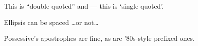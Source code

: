 This is ``double quoted'' and --- this is `single quoted'.

Ellipsis can be spaced \dots or not\dots

Possessive's apostrophes are fine, as are '80s-style prefixed ones.

